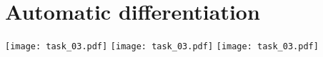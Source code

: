  \section{Automatic differentiation}
 \begin{center}
 \texttt{[image: task\_03.pdf]}    
 \newpage
 \texttt{[image: task\_03.pdf]}    
 \texttt{[image: task\_03.pdf]}    
 \end{center}